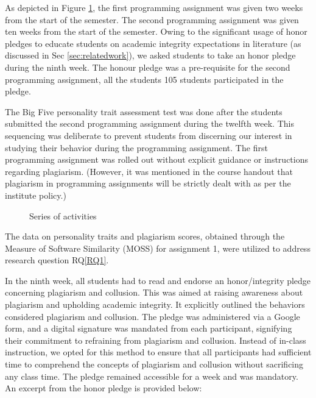 As depicted in Figure \ref{fig:activityTimeline}, the first programming assignment was given two weeks from the start of the semester. The second programming assignment was given ten weeks from the start of the semester. Owing to the significant usage of honor pledges to educate students on academic integrity expectations in literature (as discussed in Sec \ref{sec:relatedwork}), we asked students to take an honor pledge during the ninth week. The honour pledge was a pre-requisite for the second programming assignment, all the students 105 students participated in the pledge. 

The Big Five personality trait assessment test was done after the students submitted the second programming assignment during the twelfth week. This sequencing was deliberate to prevent students from discerning our interest in studying their behavior during the programming assignment. The first programming assignment was rolled out without explicit guidance or instructions regarding plagiarism. (However, it was mentioned in the course handout that plagiarism in programming assignments will be strictly dealt with as per the institute policy.)

\begin{figure}[H]
  \centering
  \vspace{-8pt}
  \caption{Series of activities}
  \label{fig:activityTimeline} \vspace{-10pt}
\end{figure}

 The data on personality traits and plagiarism scores, obtained through the Measure of Software Similarity (MOSS) for assignment 1, were utilized to address research question RQ\ref{RQ1}.

In the ninth week, all students had to read and endorse an honor/integrity pledge concerning plagiarism and collusion. This was aimed at raising awareness about plagiarism and upholding academic integrity. It explicitly outlined the behaviors considered plagiarism and collusion. The pledge was administered via a Google form, and a digital signature was mandated from each participant, signifying their commitment to refraining from plagiarism and collusion. Instead of in-class instruction, we opted for this method to ensure that all participants had sufficient time to comprehend the concepts of plagiarism and collusion without sacrificing any class time. The pledge remained accessible for a week and was mandatory. An excerpt from the honor pledge is provided below:

